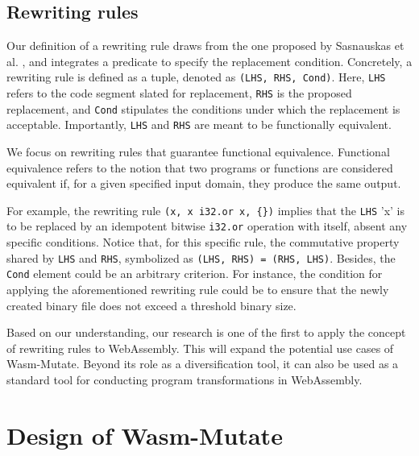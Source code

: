 \documentclass[a4paper,fleqn]{cas-dc}
\newcommand{\tool}{{\sc Wasm-Mutate}\xspace}
\begin{document}
\subsection{Rewriting rules}
\label{rewriting}

Our definition of a rewriting rule draws from the one proposed by Sasnauskas et al. \cite{2017arXiv171104422S}, and integrates a predicate to specify the replacement condition.
Concretely, a rewriting rule is defined as a tuple, denoted as \texttt{(LHS, RHS, Cond)}. Here, \texttt{LHS} refers to the code segment slated for replacement, \texttt{RHS} is the proposed replacement, and \texttt{Cond} stipulates the conditions under which the replacement is acceptable.
Importantly, \texttt{LHS} and \texttt{RHS} are meant to be functionally equivalent.

We focus on rewriting rules that guarantee functional equivalence. 
Functional equivalence refers to the notion that two programs or functions are considered equivalent if, for a given specified input domain, they produce the same output\cite{10.1145/2594291.2594334}. 

For example, the rewriting rule \texttt{(x,\ x\ i32.or\ x, \{\})} implies that the \texttt{LHS} 'x' is to be replaced by an idempotent bitwise \texttt{i32.or} operation with itself, absent any specific conditions.
Notice that, for this specific rule, the commutative property shared by \texttt{LHS} and \texttt{RHS}, symbolized as \texttt{(LHS, RHS) = (RHS, LHS)}.
Besides, the \texttt{Cond} element could be an arbitrary criterion. 
For instance, the condition for applying the aforementioned rewriting rule could be to ensure that the newly created binary file does not exceed a threshold binary size.

Based on our understanding, our research is one of the first to apply the concept of rewriting rules to WebAssembly.
This will expand the potential use cases of \tool. 
Beyond its role as a diversification tool, it can also be used as a standard tool for conducting program transformations in WebAssembly.


\section {Design of \tool}
\label{tech}
\end{document}
